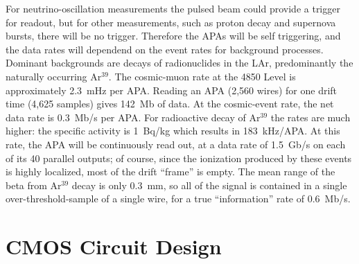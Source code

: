 For neutrino-oscillation measurements the pulsed beam could provide a
trigger for readout, but for other measurements, such as proton decay
and supernova bursts, there will be no trigger.
Therefore the APAs will be self triggering, and the
data rates will dependend on the event rates for background processes.
Dominant backgrounds are decays of radionuclides in the LAr, predominantly the naturally occurring Ar$^{39}$.
The cosmic-muon rate at the 4850 Level is approximately 2.3~mHz per APA.
Reading an APA (2,560 wires) for one drift time (4,625 samples) gives 142~Mb of data.
At the cosmic-event rate, the net data rate is 0.3~Mb/s per APA.
For radioactive decay of Ar$^{39}$ the rates are much higher: the specific activity is 1~Bq/kg which results in 183~kHz/APA.
At this rate, the APA will be continuously read out,
at a data rate of 1.5~Gb/s on each of its 40 parallel outputs;
of course, since the ionization produced by these events is highly localized,
most of the drift ``frame'' is empty.
The mean range of the beta from Ar$^{39}$ decay is only 0.3~mm, so all
of the signal is contained in a single over-threshold-sample of a single wire, for a true ``information''
rate of 0.6~Mb/s.


%
\section{CMOS Circuit Design}
\label{sec:fe-CMOS}

